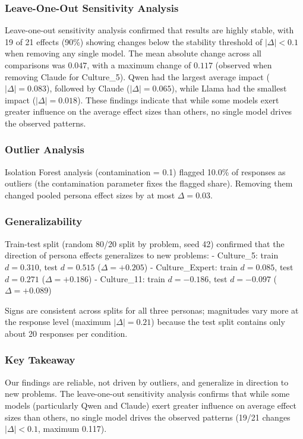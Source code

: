 \documentclass{article}
\begin{document}
\subsubsection{Leave-One-Out Sensitivity Analysis}

Leave-one-out sensitivity analysis confirmed that results are highly stable, with 19 of 21 effects (90\%) showing changes below the stability threshold of $|\Delta| < 0.1$ when removing any single model. The mean absolute change across all comparisons was $0.047$, with a maximum change of $0.117$ (observed when removing Claude for Culture\_5). Qwen had the largest average impact ($|\Delta| = 0.083$), followed by Claude ($|\Delta| = 0.065$), while Llama had the smallest impact ($|\Delta| = 0.018$). These findings indicate that while some models exert greater influence on the average effect sizes than others, no single model drives the observed patterns.

\subsubsection{Outlier Analysis}

Isolation Forest analysis (contamination = 0.1) flagged 10.0\% of responses as outliers (the contamination parameter fixes the flagged share). Removing them changed pooled persona effect sizes by at most $\Delta = 0.03$.

\subsubsection{Generalizability}

Train-test split (random 80/20 split by problem, seed 42) confirmed that the direction of persona effects generalizes to new problems:
- Culture\_5: train $d = 0.310$, test $d = 0.515$ ($\Delta = +0.205$)
- Culture\_Expert: train $d = 0.085$, test $d = 0.271$ ($\Delta = +0.186$)
- Culture\_11: train $d = -0.186$, test $d = -0.097$ ($\Delta = +0.089$)

Signs are consistent across splits for all three personas; magnitudes vary more at the response level (maximum $|\Delta| = 0.21$) because the test split contains only about 20 responses per condition.

\subsubsection{Key Takeaway}

Our findings are reliable, not driven by outliers, and generalize in direction to new problems. The leave-one-out sensitivity analysis confirms that while some models (particularly Qwen and Claude) exert greater influence on average effect sizes than others, no single model drives the observed patterns (19/21 changes $|\Delta| < 0.1$, maximum 0.117).
\end{document}
